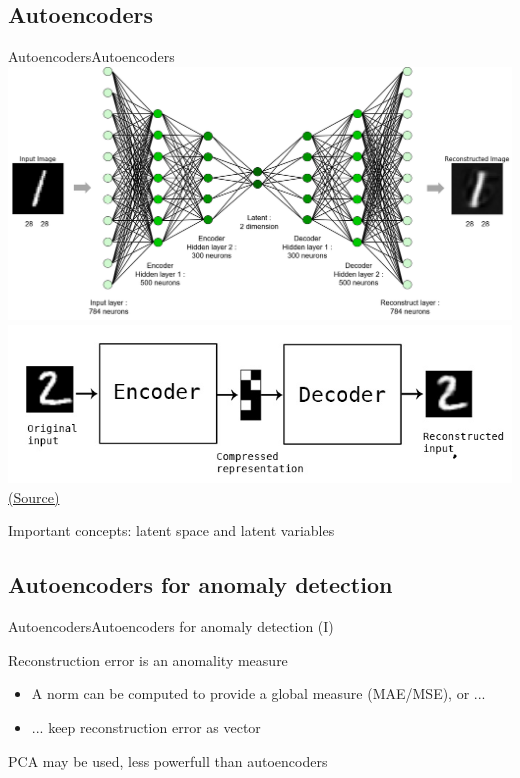\documentclass[10pt,compress]{beamer} %
\begin{document}
\subsection{Autoencoders}

\begin{frame}{Autoencoders}{Autoencoders}
	\centering\includegraphics[width=0.75\linewidth]{figs/autoencoder.png}\\
	\centering\includegraphics[width=0.3\linewidth]{figs/autoencoder2.png}\\
	\scriptsize\href{http://i-systems.github.io/HSE545/machine\%20learning\%20all/KIMM/06\_KIMM\_Autoencoder.html}{(Source)}
	\medskip

	\normalsize

	\begin{flushleft}
	Important concepts: \alert{latent space} and \alert{latent variables}
	\end{flushleft}
\end{frame}

\subsection{Autoencoders for anomaly detection}

\begin{frame}{Autoencoders}{Autoencoders for anomaly detection (I)}
	
	\bigskip
	\alert{Reconstruction error} is an anomality measure
	\begin{itemize}
		\item A norm can be computed to provide a global measure (MAE/MSE), or ...
		\item ... keep reconstruction error as vector
	\end{itemize}
    PCA may be used, less powerfull than autoencoders
\end{frame}
\end{document}
